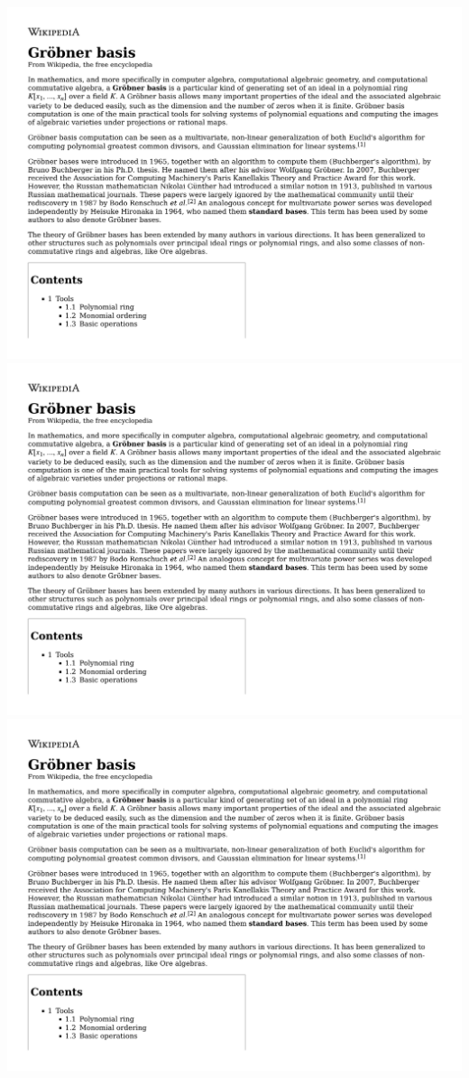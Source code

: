 \documentclass{beamer}
\begin{document}
\begin{frame}
\includegraphics[clip, trim=0in 5.6in 0in 0.75in, width=\textwidth, page=1]{GrobnerBasis.pdf}
\includegraphics[clip, trim=0in 6.25in 0in 0.5in, width=\textwidth, page=9]{GrobnerBasis.pdf}
\includegraphics[clip, trim=0in 3in 0in 0.5in, width=\textwidth, page=13]{GrobnerBasis.pdf}
\end{frame}
\end{document}
